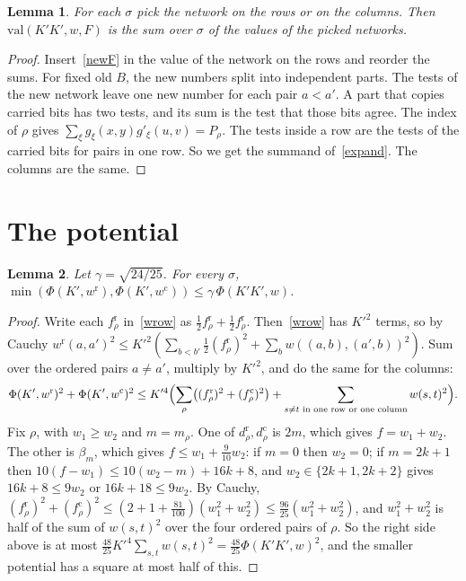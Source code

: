 \documentclass[10pt]{article}
\newtheorem{lemma}{Lemma}
\newcommand{\val}{\mathrm{val}}
\begin{document}
\begin{lemma}\label{lem:step}
For each $\sigma$ pick the network on the rows or on the columns. Then $\val(K'K',w,F)$ is the sum over $\sigma$ of the values of the picked networks.
\end{lemma}
\begin{proof}
Insert~\eqref{newF} in the value of the network on the rows and reorder the sums. For fixed old $B$, the new numbers split into independent parts. The tests of the new network leave one new number for each pair $a<a'$. A part that copies carried bits has two tests, and its sum is the test that those bits agree. The index of $\rho$ gives $\sum_\xi g_\xi(x,y)g'_\xi(u,v)=P_\rho$. The tests inside a row are the tests of the carried bits for pairs in one row. So we get the summand of~\eqref{expand}. The columns are the same.
\end{proof}

\section{The potential}

\begin{lemma}\label{lem:phi}
Let $\gamma=\sqrt{24/25}$. For every $\sigma$, $\min(\Phi(K',w^{\mathrm r}),\Phi(K',w^{\mathrm c}))\le\gamma\,\Phi(K'K',w)$.
\end{lemma}
\begin{proof}
Write each $f^{\mathrm r}_\rho$ in~\eqref{wrow} as $\frac12f^{\mathrm r}_\rho+\frac12f^{\mathrm r}_\rho$. Then~\eqref{wrow} has $K'^2$ terms, so by Cauchy $w^{\mathrm r}(a,a')^2\le K'^2(\sum_{b<b'}\tfrac12(f^{\mathrm r}_\rho)^2+\sum_bw((a,b),(a',b))^2)$. Sum over the ordered pairs $a\ne a'$, multiply by $K'^2$, and do the same for the columns:
\[
\Phi(K',w^{\mathrm r})^2+\Phi(K',w^{\mathrm c})^2\le K'^4\Bigl(\sum_{\rho}\bigl((f^{\mathrm r}_\rho)^2+(f^{\mathrm c}_\rho)^2\bigr)+\sum_{s\ne t\text{ in one row or one column}}w(s,t)^2\Bigr).
\]
Fix $\rho$, with $w_1\ge w_2$ and $m=m_\rho$. One of $d^{\mathrm r}_\rho,d^{\mathrm c}_\rho$ is $2m$, which gives $f=w_1+w_2$. The other is $\beta_m$, which gives $f\le w_1+\frac9{10}w_2$: if $m=0$ then $w_2=0$; if $m=2k+1$ then $10(f-w_1)\le10(w_2-m)+16k+8$, and $w_2\in\{2k+1,2k+2\}$ gives $16k+8\le9w_2$ or $16k+18\le9w_2$. By Cauchy, $(f^{\mathrm r}_\rho)^2+(f^{\mathrm c}_\rho)^2\le(2+1+\frac{81}{100})(w_1^2+w_2^2)\le\frac{96}{25}(w_1^2+w_2^2)$, and $w_1^2+w_2^2$ is half of the sum of $w(s,t)^2$ over the four ordered pairs of $\rho$. So the right side above is at most $\frac{48}{25}K'^4\sum_{s,t}w(s,t)^2=\frac{48}{25}\Phi(K'K',w)^2$, and the smaller potential has a square at most half of this.
\end{proof}
\end{document}
